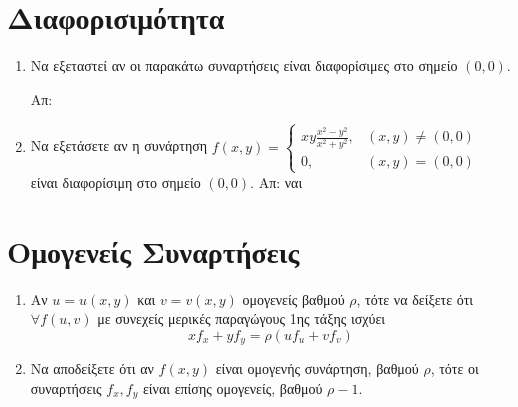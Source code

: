 \section*{Διαφορισιμότητα}

\begin{enumerate}
  \item Να εξεταστεί αν οι παρακάτω συναρτήσεις είναι διαφορίσιμες στο σημείο 
    $ (0,0) $.

    \hfill Απ: 

  \item Να εξετάσετε αν η συνάρτηση 
    $
    f(x,y) = 
    \begin{cases} 
      xy \frac{x^{2}-y^{2}}{x^{2}+y^{2}}, & (x,y) 
      \neq (0,0) \\ 
      0, & (x,y) = (0,0)
    \end{cases}
    $ 
    είναι διαφορίσιμη στο σημείο $ (0,0) $. 
    \hfill Απ: ναι 
\end{enumerate}

\section*{Ομογενείς Συναρτήσεις}

\begin{enumerate}
  \item Αν $ u = u(x,y) $ και $ v=v(x,y) $ ομογενείς βαθμού $ \rho $, 
    τότε να δείξετε ότι $ \forall f(u,v) $ με συνεχείς μερικές παραγώγους 1ης τάξης
    ισχύει 
    \[
      xf_{x}+yf_{y}= \rho (u f_{u}+vf_{v}) 
    \] 
  \item Να αποδείξετε ότι αν $f(x,y)$ είναι ομογενής συνάρτηση, βαθμού $ \rho $, τότε 
    οι συναρτήσεις $ f_{x}, f_{y} $ είναι επίσης ομογενείς, βαθμού $ \rho -1 $.
\end{enumerate}

